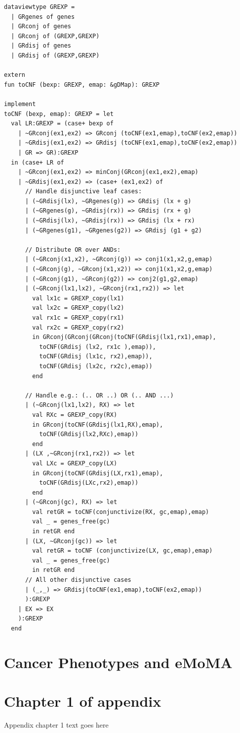 \documentclass[phd,tocprelim]{cornell}
\theoremstyle{break}
\begin{document}
\begin{verbatim}
dataviewtype GREXP = 
  | GRgenes of genes
  | GRconj of genes
  | GRconj of (GREXP,GREXP)
  | GRdisj of genes
  | GRdisj of (GREXP,GREXP)

extern
fun toCNF (bexp: GREXP, emap: &gDMap): GREXP

implement
toCNF (bexp, emap): GREXP = let     
  val LR:GREXP = (case+ bexp of 
    | ~GRconj(ex1,ex2) => GRconj (toCNF(ex1,emap),toCNF(ex2,emap))
    | ~GRdisj(ex1,ex2) => GRdisj (toCNF(ex1,emap),toCNF(ex2,emap))   
    | GR => GR):GREXP
  in (case+ LR of  
    | ~GRconj(ex1,ex2) => minConj(GRconj(ex1,ex2),emap) 
    | ~GRdisj(ex1,ex2) => (case+ (ex1,ex2) of
      // Handle disjunctive leaf cases:         
      | (~GRdisj(lx), ~GRgenes(g)) => GRdisj (lx + g) 
      | (~GRgenes(g), ~GRdisj(rx)) => GRdisj (rx + g)
      | (~GRdisj(lx), ~GRdisj(rx)) => GRdisj (lx + rx)
      | (~GRgenes(g1), ~GRgenes(g2)) => GRdisj (g1 + g2)

      // Distribute OR over ANDs:
      | (~GRconj(x1,x2), ~GRconj(g)) => conj1(x1,x2,g,emap) 
      | (~GRconj(g), ~GRconj(x1,x2)) => conj1(x1,x2,g,emap) 
      | (~GRconj(g1), ~GRconj(g2)) => conj2(g1,g2,emap)
      | (~GRconj(lx1,lx2), ~GRconj(rx1,rx2)) => let
        val lx1c = GREXP_copy(lx1)
        val lx2c = GREXP_copy(lx2) 
        val rx1c = GREXP_copy(rx1)
        val rx2c = GREXP_copy(rx2) 
        in GRconj(GRconj(GRconj(toCNF(GRdisj(lx1,rx1),emap), 
          toCNF(GRdisj (lx2, rx1c ),emap)),
          toCNF(GRdisj (lx1c, rx2),emap)), 
          toCNF(GRdisj (lx2c, rx2c),emap)) 
        end

      // Handle e.g.: (.. OR ..) OR (.. AND ...) 
      | (~GRconj(lx1,lx2), RX) => let
        val RXc = GREXP_copy(RX)
        in GRconj(toCNF(GRdisj(lx1,RX),emap),
          toCNF(GRdisj(lx2,RXc),emap)) 
        end
      | (LX ,~GRconj(rx1,rx2)) => let
        val LXc = GREXP_copy(LX)
        in GRconj(toCNF(GRdisj(LX,rx1),emap),
          toCNF(GRdisj(LXc,rx2),emap)) 
        end
      | (~GRconj(gc), RX) => let
        val retGR = toCNF(conjunctivize(RX, gc,emap),emap)
        val _ = genes_free(gc)
        in retGR end
      | (LX, ~GRconj(gc)) => let
        val retGR = toCNF (conjunctivize(LX, gc,emap),emap)
        val _ = genes_free(gc)
        in retGR end
      // All other disjunctive cases
      | (_,_) => GRdisj(toCNF(ex1,emap),toCNF(ex2,emap))
      ):GREXP
    | EX => EX
    ):GREXP
  end
\end{verbatim}


\chapter{Cancer Phenotypes and eMoMA}

\appendix
\chapter{Chapter 1 of appendix}
Appendix chapter 1 text goes here


\end{document}

